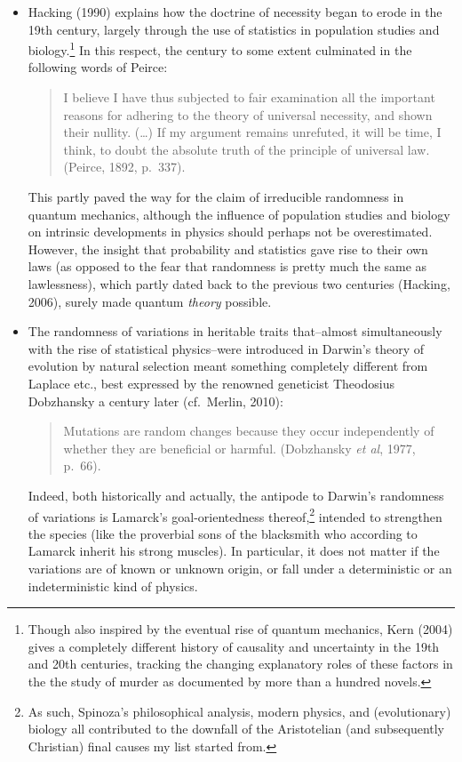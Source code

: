 \documentclass[11pt,a4paper]{article}
\numberwithin{equation}{section}
\newcommand{\qm}{quantum mechanics}
\begin{document}
\begin{itemize}
{}
 \item Hacking (1990) explains  how the doctrine of necessity began to erode in the 19th century, largely through the use of statistics in population studies and biology.\footnote{Though also inspired by the eventual rise of \qm, Kern (2004) gives a completely different history of causality and uncertainty in the 19th and 20th centuries, tracking the changing explanatory roles of these factors in the the study of murder as documented by more than a hundred novels.} In this respect, the century
to some extent  culminated in the following words of Peirce:
 \begin{quote}\begin{small}
I believe I have thus subjected to fair examination all the important reasons for adhering to the theory of universal necessity, and shown their nullity.  (\ldots) If my argument remains unrefuted,
it will be time, I think, to doubt the absolute truth of the principle of universal law. (Peirce, 1892, p.\ 337).
\end{small}\end{quote}
 This partly paved the way for the claim of irreducible randomness in \qm, although the influence of population studies and biology on intrinsic developments in physics should perhaps not be overestimated. However, the insight that probability and statistics gave rise to their own laws (as opposed to the fear that randomness is pretty much the same as lawlessness), which partly dated back to the previous two centuries (Hacking, 2006),
 surely made quantum \emph{theory} possible.
\item The randomness of variations in heritable traits that--almost simultaneously with the rise of statistical physics--were introduced in Darwin's theory of evolution by natural selection meant something completely different from Laplace etc., best expressed by the renowned geneticist Theodosius Dobzhansky a century later (cf.\ Merlin, 2010):
\begin{quote}\begin{small}
 Mutations are random changes because they occur independently of whether they are beneficial or harmful.
 (Dobzhansky \emph{et al}, 1977, p.\ 66).
\end{small}\end{quote}
 Indeed, both historically and actually, the antipode to Darwin's randomness of variations  is Lamarck's goal-orientedness thereof,\footnote{ As such, Spinoza's philosophical analysis, modern physics, and (evolutionary) biology all contributed to the downfall of the Aristotelian (and subsequently Christian)  final causes my list started from. } intended to strengthen the species (like the proverbial sons of the  blacksmith who according to Lamarck inherit his strong muscles). In particular, it does not matter if the variations are of known or unknown origin, or fall under a deterministic or an indeterministic kind of physics.

\end{itemize}
\end{document}
